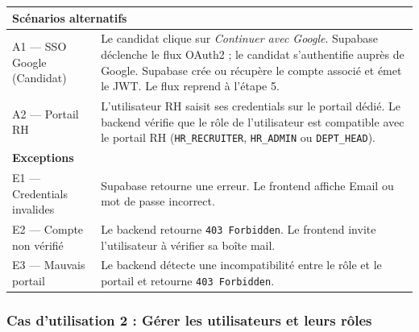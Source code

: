 \begin{longtable}{|p{4cm}|p{10cm}|}
\multicolumn{2}{|l|}{\textbf{Scénarios alternatifs}} \\ \hline
A1 — SSO Google (Candidat) &
\vspace{2pt}
Le candidat clique sur \textit{Continuer avec Google}. Supabase déclenche le flux OAuth2 ; le candidat s'authentifie auprès de Google. Supabase crée ou récupère le compte associé et émet le JWT. Le flux reprend à l'étape 5.
\vspace{2pt} \\ \hline
A2 — Portail RH & L'utilisateur RH saisit ses credentials sur le portail dédié. Le backend vérifie que le rôle de l'utilisateur est compatible avec le portail RH (\texttt{HR\_RECRUITER}, \texttt{HR\_ADMIN} ou \texttt{DEPT\_HEAD}). \\ \hline
\multicolumn{2}{|l|}{\textbf{Exceptions}} \\ \hline
E1 — Credentials invalides & Supabase retourne une erreur. Le frontend affiche \og{}Email ou mot de passe incorrect\fg{}. \\ \hline
E2 — Compte non vérifié & Le backend retourne \texttt{403 Forbidden}. Le frontend invite l'utilisateur à vérifier sa boîte mail. \\ \hline
E3 — Mauvais portail & Le backend détecte une incompatibilité entre le rôle et le portail et retourne \texttt{403 Forbidden}. \\ \hline
\end{longtable}
\renewcommand{\arraystretch}{1}

\subsubsection{Cas d'utilisation 2 : Gérer les utilisateurs et leurs rôles}

